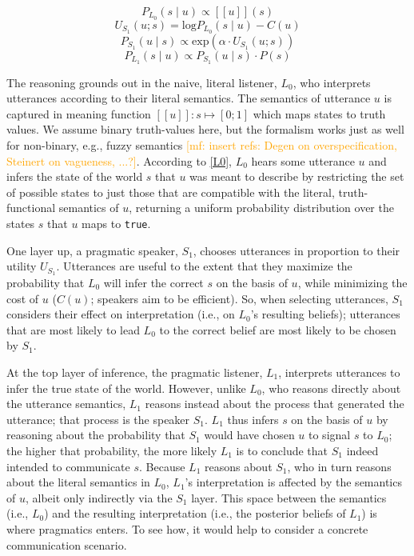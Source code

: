 \documentclass{sp}
\newcommand{\mf}[1]{\textcolor{orange}{[mf: #1]}}
\newcommand{\sem}[1]{\ensuremath{[\![#1]\!]}}
\begin{document}
\begin{equation} \label{L0}
P_{L_0}(s \mid u) \propto \sem{u}(s)
\end{equation}
\begin{equation} \label{U}
U_{S_1}(u; s) = \textrm{log}P_{L_0}(s \mid u) - C(u)
\end{equation}
\begin{equation} \label{S1}
P_{S_1}(u \mid s) \propto \textrm{exp}(\alpha \cdot U_{S_1}(u;s))
\end{equation}
\begin{equation} \label{L1}
P_{L_1}(s \mid u) \propto P_{S_1}(u \mid s) \cdot P(s)
\end{equation}

The reasoning grounds out in the naive, literal listener, $L_0$, who interprets utterances
according to their literal semantics. The semantics of utterance $u$ is captured in meaning
function $\sem{u} \colon s \mapsto [0;1]$ which maps states to truth values. We assume binary
truth-values here, but the formalism works just as well for non-binary, e.g., fuzzy semantics
\mf{insert refs: Degen on overspecification, Steinert on vagueness, ...?}. According to
\eqref{L0}, $L_0$ hears some utterance $u$ and infers the state of the world $s$ that $u$ was
meant to describe by restricting the set of possible states to just those that are compatible
with the literal, truth-functional semantics of $u$, returning a uniform probability
distribution over the states $s$ that $u$ maps to \texttt{true}.

One layer up, a pragmatic speaker, $S_1$, chooses utterances in proportion to their utility $U_{S_{1}}$. Utterances are useful to the extent that they maximize the probability that $L_0$ will infer the correct $s$ on the basis of $u$, while minimizing the cost of $u$ ($C(u)$; speakers aim to be efficient). So, when selecting utterances, $S_1$ considers their effect on interpretation (i.e., on $L_0$'s resulting beliefs); utterances that are most likely to lead $L_0$ to the correct belief are most likely to be chosen by $S_1$.

At the top layer of inference, the pragmatic listener, $L_1$, interprets utterances to infer the true state of the world. However, unlike $L_0$, who reasons directly about the utterance semantics, $L_1$ reasons instead about the process that generated the utterance; that process is the speaker $S_1$. $L_1$ thus infers $s$ on the basis of $u$ by reasoning about the probability that $S_1$ would have chosen $u$ to signal $s$ to $L_0$; the higher that probability, the more likely $L_1$ is to conclude that $S_1$ indeed intended to communicate $s$. Because $L_1$ reasons about $S_1$, who in turn reasons about the literal semantics in $L_0$, $L_1$'s interpretation is affected by the semantics of $u$, albeit only indirectly via the $S_1$ layer. This space between the semantics (i.e., $L_0$) and the resulting interpretation (i.e., the posterior beliefs of $L_1$) is where pragmatics enters. To see how, it would help to consider a concrete communication scenario.
\end{document}

